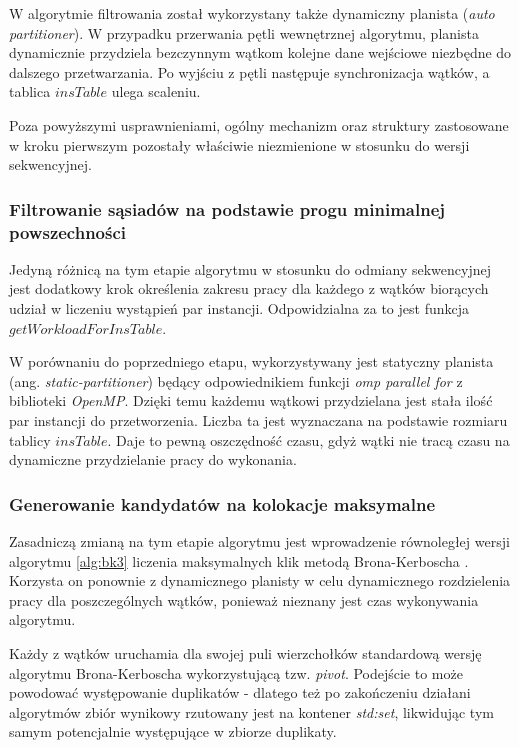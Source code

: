 \documentclass[12pt]{article}
\newcounter{algorytm}
\begin{document}
W algorytmie filtrowania został wykorzystany także dynamiczny planista (\textit{auto partitioner}). W przypadku przerwania pętli wewnętrznej algorytmu, planista dynamicznie przydziela bezczynnym wątkom kolejne dane wejściowe niezbędne do dalszego przetwarzania. Po wyjściu z pętli następuje synchronizacja wątków, a tablica $ insTable $ ulega scaleniu.

Poza powyższymi usprawnieniami, ogólny mechanizm oraz struktury zastosowane w kroku pierwszym pozostały właściwie niezmienione w stosunku do wersji sekwencyjnej. 

\subsubsection{Filtrowanie sąsiadów na podstawie progu minimalnej powszechności}

Jedyną różnicą na tym etapie algorytmu w stosunku do odmiany sekwencyjnej jest dodatkowy krok określenia zakresu pracy dla każdego z wątków biorących udział w liczeniu wystąpień par instancji. Odpowidzialna za to jest funkcja $ getWorkloadForInsTable $.

W porównaniu do poprzedniego etapu, wykorzystywany jest statyczny planista (ang. \textit{static-partitioner}) będący odpowiednikiem funkcji \textit{omp parallel for} z biblioteki \textit{OpenMP}. Dzięki temu każdemu wątkowi przydzielana jest stała ilość par instancji do przetworzenia. Liczba ta jest wyznaczana na podstawie rozmiaru tablicy $ insTable $. Daje to pewną oszczędność czasu, gdyż wątki nie tracą czasu na dynamiczne przydzielanie pracy do wykonania.

\subsubsection{Generowanie kandydatów na kolokacje maksymalne}

Zasadniczą zmianą na tym etapie algorytmu jest wprowadzenie równoległej wersji algorytmu \ref{alg:bk3} liczenia maksymalnych klik metodą Brona-Kerboscha \cite{kerbosz}. Korzysta on ponownie z dynamicznego planisty w celu dynamicznego rozdzielenia pracy dla poszczególnych wątków, ponieważ nieznany jest czas wykonywania algorytmu.

Każdy z wątków uruchamia dla swojej puli wierzchołków standardową wersję algorytmu Brona-Kerboscha wykorzystującą tzw. \textit{pivot}. Podejście to może powodować występowanie duplikatów - dlatego też po zakończeniu działani algorytmów zbiór wynikowy rzutowany jest na kontener \textit{std:set}, likwidując tym samym potencjalnie występujące w zbiorze duplikaty. 
\end{document}
